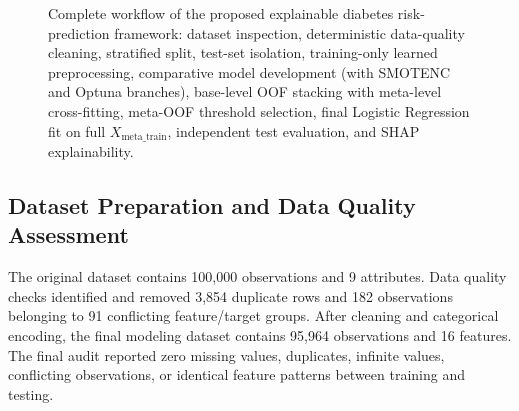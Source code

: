 \documentclass[conference]{IEEEtran}
\begin{document}
\begin{figure}[!htbp]
\caption{Complete workflow of the proposed explainable diabetes risk-prediction framework: dataset inspection, deterministic data-quality cleaning, stratified split, test-set isolation, training-only learned preprocessing, comparative model development (with SMOTENC and Optuna branches), base-level OOF stacking with meta-level cross-fitting, meta-OOF threshold selection, final Logistic Regression fit on full $X_{\text{meta\_train}}$, independent test evaluation, and SHAP explainability.}
\label{fig:workflow}
\end{figure}

\subsection{Dataset Preparation and Data Quality Assessment}

The original dataset contains 100,000 observations and 9 attributes. Data quality checks identified and removed 3,854 duplicate rows and 182 observations belonging to 91 conflicting feature/target groups. After cleaning and categorical encoding, the final modeling dataset contains 95,964 observations and 16 features. The final audit reported zero missing values, duplicates, infinite values, conflicting observations, or identical feature patterns between training and testing.
\end{document}
